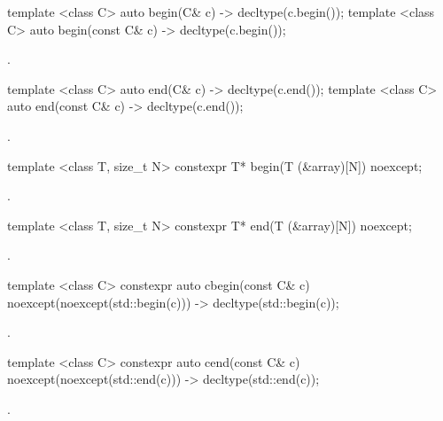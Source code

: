 {\color{remclr}
%
\begin{itemdecl}
template <class C> auto begin(C& c) -> decltype(c.begin());
template <class C> auto begin(const C& c) -> decltype(c.begin());
\end{itemdecl}

\begin{itemdescr}
\pnum
\returns {}.
\end{itemdescr}

%
\begin{itemdecl}
template <class C> auto end(C& c) -> decltype(c.end());
template <class C> auto end(const C& c) -> decltype(c.end());
\end{itemdecl}

\begin{itemdescr}
\pnum
\returns {}.
\end{itemdescr}

%
\begin{itemdecl}
template <class T, size_t N> constexpr T* begin(T (&array)[N]) noexcept;
\end{itemdecl}

\begin{itemdescr}
\pnum
\returns {}.
\end{itemdescr}

%
\begin{itemdecl}
template <class T, size_t N> constexpr T* end(T (&array)[N]) noexcept;
\end{itemdecl}

\begin{itemdescr}
\pnum
\returns {}.
\end{itemdescr}

%
\begin{itemdecl}
template <class C> constexpr auto cbegin(const C& c) noexcept(noexcept(std::begin(c)))
  -> decltype(std::begin(c));
\end{itemdecl}
\begin{itemdescr}
\pnum \returns {}.
\end{itemdescr}

%
\begin{itemdecl}
template <class C> constexpr auto cend(const C& c) noexcept(noexcept(std::end(c)))
  -> decltype(std::end(c));
\end{itemdecl}
\begin{itemdescr}
\pnum \returns {}.
\end{itemdescr}

}
